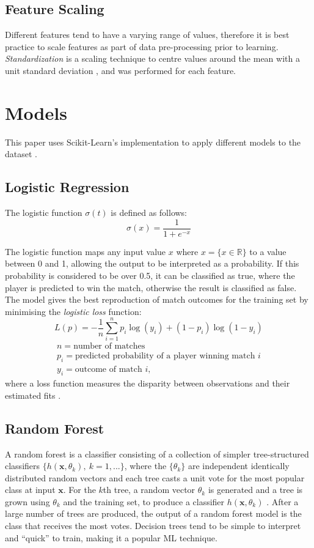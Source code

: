 \subsection{Feature Scaling}
Different features tend to have a varying range of values, therefore it is best practice to scale features as part of data pre-processing prior to learning. \textit{Standardization} is a scaling technique to centre values around the mean with a unit standard deviation \cite{bollegala2017dynamic}, and was performed for each feature. 

\section{Models} \label{models}
This paper uses Scikit-Learn's implementation to apply different models to the dataset \cite{pedregosa2011scikit}.

\subsection{Logistic Regression}
The logistic function $\sigma(t)$ is defined as follows:
$$
\sigma(x) = \frac{1}{1+e^{-x}}
$$

The logistic function maps any input value $x$ where $x = \{x\in \mathbb{R} \}$ to a value between 0 and 1, allowing the output to be interpreted as a probability. If this probability is considered to be over 0.5, it can be classified as true, where the player is predicted to win the match, otherwise the result is classified as false. The model gives the best reproduction of match outcomes for the training set by minimising the \textit{logistic loss} function:
$$
L(p) = -\frac{1}{n} \sum_{i=1}^n p_i \log(y_i) + (1-p_i)\log(1-y_i)
$$
\begin{equation*}
\begin{gathered}
    n = \text{number of matches} \\
    p_i = \text{predicted probability of a player winning match $i$} \\
    y_i = \text{outcome of match $i$},
\end{gathered}
\end{equation*}
where a loss function measures the disparity between observations and their estimated fits \cite{hazan2014logistic}.

\subsection{Random Forest}
A random forest is a classifier consisting of a collection of simpler tree-structured classifiers $\{h(\textbf{x},\theta_k),\ k=1,...\}$, where the $\{\theta_k\}$ are independent identically distributed random vectors and each tree casts a unit vote for the most popular class at input $\textbf{x}$. For the $k$th tree, a random vector $\theta_k$ is generated and a tree is grown using $\theta_k$ and the training set, to produce a classifier $h(\textbf{x}, \theta_k)$ \cite{breiman2001random}. After a large number of trees are produced, the output of a random forest model is the class that receives the most votes. Decision trees tend to be simple to interpret and ``quick'' to train, making it a popular ML technique.

